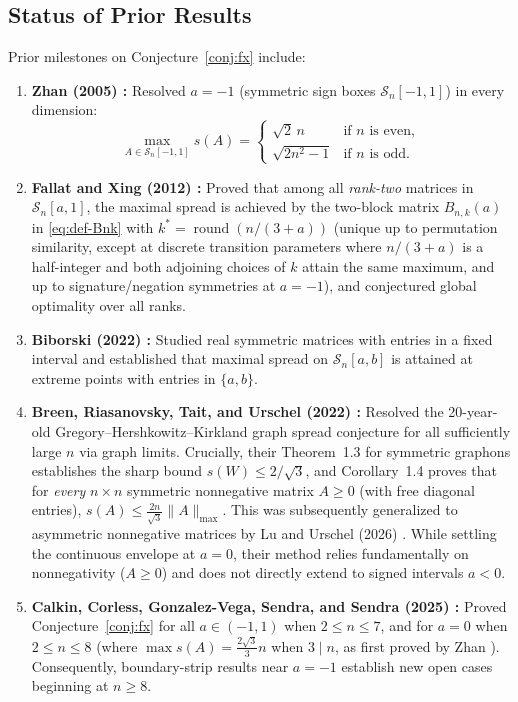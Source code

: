 \documentclass[11pt,reqno]{article}
\theoremstyle{definition}
\begin{document}
\subsection{Status of Prior Results}
Prior milestones on Conjecture~\ref{conj:fx} include:
\begin{enumerate}
    \item \textbf{Zhan (2005) \cite{zhan2005extremal}:} Resolved $a = -1$ (symmetric sign boxes $\mathcal{S}_n[-1, 1]$) in every dimension:
    \[
    \max_{A \in \mathcal{S}_n[-1, 1]} s(A) =
    \begin{cases}
        \sqrt{2}\,n & \text{if } n \text{ is even},\\
        \sqrt{2n^2 - 1} & \text{if } n \text{ is odd}.
    \end{cases}
    \]
    \item \textbf{Fallat and Xing (2012) \cite{fallat2012spread}:} Proved that among all \emph{rank-two} matrices in $\mathcal{S}_n[a, 1]$, the maximal spread is achieved by the two-block matrix $B_{n, k}(a)$ in \eqref{eq:def-Bnk} with $k^* = \operatorname{round}(n/(3+a))$ (unique up to permutation similarity, except at discrete transition parameters where $n/(3+a)$ is a half-integer and both adjoining choices of $k$ attain the same maximum, and up to signature/negation symmetries at $a=-1$), and conjectured global optimality over all ranks.
    \item \textbf{Biborski (2022) \cite{biborski2022spread}:} Studied real symmetric matrices with entries in a fixed interval and established that maximal spread on $\mathcal{S}_n[a, b]$ is attained at extreme points with entries in $\{a, b\}$.
    \item \textbf{Breen, Riasanovsky, Tait, and Urschel (2022) \cite{breen2022spread}:} Resolved the 20-year-old Gregory--Hershkowitz--Kirkland graph spread conjecture for all sufficiently large $n$ via graph limits. Crucially, their Theorem~1.3 for symmetric graphons establishes the sharp bound $s(W) \le 2/\sqrt{3}$, and Corollary~1.4 proves that for \emph{every} $n \times n$ symmetric nonnegative matrix $A \ge 0$ (with free diagonal entries), $s(A) \le \frac{2n}{\sqrt{3}} \|A\|_{\max}$. This was subsequently generalized to asymmetric nonnegative matrices by Lu and Urschel (2026) \cite{lu2026spread}. While settling the continuous envelope at $a = 0$, their method relies fundamentally on nonnegativity ($A \ge 0$) and does not directly extend to signed intervals $a < 0$.
    \item \textbf{Calkin, Corless, Gonzalez-Vega, Sendra, and Sendra (2025) \cite{corless2025bohemian}:} Proved Conjecture~\ref{conj:fx} for all $a \in (-1, 1)$ when $2 \le n \le 7$, and for $a = 0$ when $2 \le n \le 8$ (where $\max s(A) = \frac{2\sqrt{3}}{3} n$ when $3 \mid n$, as first proved by Zhan \cite{zhan2005extremal}). Consequently, boundary-strip results near $a = -1$ establish new open cases beginning at $n \ge 8$.

\end{enumerate}
\end{document}
